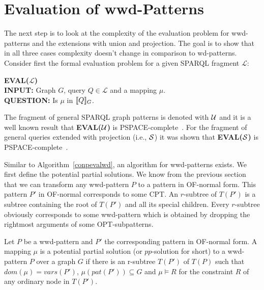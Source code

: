 \section{Evaluation of wwd-Patterns}
The next step is to look at the complexity of the evaluation problem for
wwd-patterns and the extensions with union and projection. The goal is to show
that in all three cases complexity doesn't change in comparison to wd-patterns.
Consider first the formal evaluation problem for a given SPARQL fragment $\mathcal{L}$:
\begin{framed}\noindent \textbf{EVAL($\mathcal{L}$)}\\
	\textbf{INPUT:} Graph $G$, query $Q \in  \mathcal{L}$ and a mapping $\mu$.\\
	\textbf{QUESTION:} Is $\mu$ in $\llbracket Q \rrbracket_G$.
\end{framed}
The fragment of general SPARQL graph patterns is denoted with $\mathcal{U}$ and it is a
well known result that \textbf{EVAL($\mathcal{U}$)} is PSPACE-complete~\cite{perez2009semantics}.
For the fragment of general queries extended with projection (i.e., $\mathcal{S}$)
it was shown that \textbf{EVAL($\mathcal{S}$)} is PSPACE-complete~\cite{letelier2013static}.


Similar to Algorithm~\ref{conpevalwd}, an algorithm for wwd-patterns exists. 
We first define the potential partial solutions. 
We know from the previous section that we can transform any wwd-pattern $P$ to a
pattern in OF-normal form. This pattern $P'$ in OF-normal corresponds to some
CPT. An $r$-subtree of $T(P')$ is a subtree containing the root of $T(P')$ and
all its special children. Every $r$-subtree obviously corresponds to some
wwd-pattern which is obtained by dropping the rightmost arguments of some
OPT-subpatterns.

\begin{definition}
	Let $P$ be a wwd-pattern and $P'$ the corresponding pattern in OF-normal
	form.
	A mapping $\mu$ is a potential partial solution (or $pp$-solution for short)
	to a wwd-pattern $P$ over a graph $G$ if there is an r-subtree $T(P')$ of
	$T(P)$ such that $dom(\mu) = vars(P')$, $\mu(pat(P')) \subseteq G$ and $\mu
	\models R$ for the constraint $R$ of any ordinary node in $T(P')$.
\end{definition}

